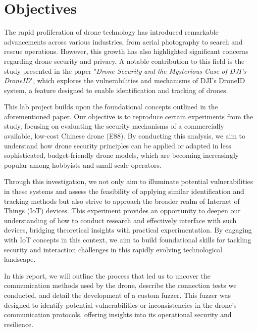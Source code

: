 \section{Objectives}
The rapid proliferation of drone technology has introduced remarkable advancements across various industries, from aerial photography to search and rescue operations. However, this growth has also highlighted significant concerns regarding drone security and privacy. A notable contribution to this field is the study presented in the paper "\textit{Drone Security and the Mysterious Case of DJI’s DroneID}", which explores the vulnerabilities and mechanisms of DJI's DroneID system, a feature designed to enable identification and tracking of drones.

This lab project builds upon the foundational concepts outlined in the aforementioned paper. Our objective is to reproduce certain experiments from the study, focusing on evaluating the security mechanisms of a commercially available, low-cost Chinese drone (E88). By conducting this analysis, we aim to understand how drone security principles can be applied or adapted in less sophisticated, budget-friendly drone models, which are becoming increasingly popular among hobbyists and small-scale operators.

Through this investigation, we not only aim to illuminate potential vulnerabilities in these systems and assess the feasibility of applying similar identification and tracking methods but also strive to approach the broader realm of Internet of Things (IoT) devices. This experiment provides an opportunity to deepen our understanding of how to conduct research and effectively interface with such devices, bridging theoretical insights with practical experimentation. By engaging with IoT concepts in this context, we aim to build foundational skills for tackling security and interaction challenges in this rapidly evolving technological landscape.

In this report, we will outline the process that led us to uncover the communication methods used by the drone, describe the connection tests we conducted, and detail the development of a custom fuzzer. This fuzzer was designed to identify potential vulnerabilities or inconsistencies in the drone's communication protocols, offering insights into its operational security and resilience.